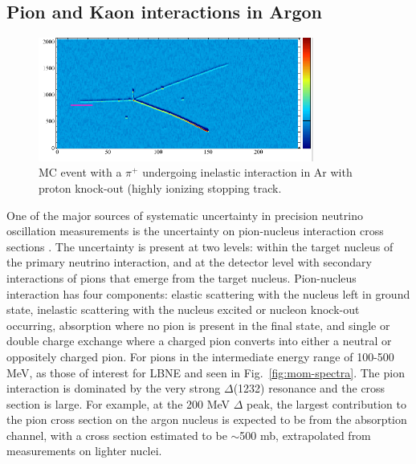 \documentclass[DIV=calc, paper=a4, fontsize=10pt, twocolumn]{scrartcl}	 %
\begin{document}
{\subsection{Pion and Kaon interactions in Argon}

\begin{figure}[!h]
\begin{centering}
\includegraphics[height=1.6in]{Figures/piplus}
\vspace{-0.5cm}
\caption{
{\scriptsize \sf MC event with a $\pi^+$ undergoing inelastic interaction in Ar with proton knock-out (highly ionizing stopping track. }
}
\label{fig:piplus}
\end{centering}
\end{figure}

One of the major sources of systematic uncertainty in precision neutrino oscillation measurements is the uncertainty on pion-nucleus interaction cross sections \cite{t2k}. The uncertainty is present at two levels: within the target nucleus of the primary neutrino interaction, and at the detector level with secondary interactions of pions that emerge from the target nucleus. Pion-nucleus interaction has four components: elastic scattering with the nucleus left in ground state, inelastic scattering with the nucleus excited or nucleon knock-out occurring,  absorption where no pion is present in the final state, and single or double charge exchange where a charged pion converts into either a neutral or oppositely charged pion.  For pions in the intermediate energy range of 100-500 MeV, as those of interest for LBNE and seen in Fig.~\ref{fig:mom-spectra}.  The pion interaction is dominated by the very strong $\Delta$(1232) resonance and the cross section is large. For example, at the 200 MeV $\Delta$ peak, the largest contribution to the pion cross section on the argon nucleus is expected to be from the absorption channel, with a cross section estimated to be $\sim$500 mb, extrapolated from measurements on lighter nuclei. 

}
\end{document}
